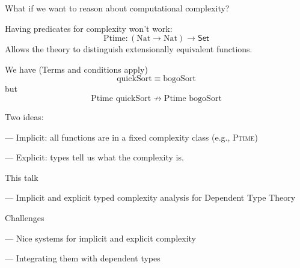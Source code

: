 \documentclass[xetex,serif,mathserif,aspectratio=169]{beamer}
\newcommand{\youtem}{\quad \textcolor{titlered!80}{---} \quad}
\newcommand{\HEAD}[1]{\textcolor{titlered}{#1}}
\begin{document}
\begin{frame}

  What if we want to reason about computational complexity?

  \pause
  \bigskip

  Having predicates for complexity won't work:
  \begin{displaymath}
    \mathrm{Ptime} : (\mathrm{Nat} \to \mathrm{Nat}) \to \mathsf{Set}
  \end{displaymath}
  Allows the theory to distinguish extensionally equivalent functions.

  \pause
  \bigskip
  We have \hspace{3em} \textcolor{black!60}{(Terms and conditions apply)}
  \begin{displaymath}
    \mathrm{quickSort} \equiv \mathrm{bogoSort}
  \end{displaymath}
  but
  \begin{displaymath}
    \mathrm{Ptime}\,\,\mathrm{quickSort} \not\to \mathrm{Ptime}\,\,\mathrm{bogoSort}
  \end{displaymath}

\end{frame}

\begin{frame}

  Two ideas:

  \medskip

  \youtem Implicit: all functions are in a fixed complexity class (e.g., \textsc{Ptime})

  \medskip

  \youtem Explicit: types tell us what the complexity is.

\end{frame}

\begin{frame}

  \HEAD{This talk}

  \medskip

  \youtem Implicit and explicit typed complexity analysis for Dependent Type Theory

  \bigskip

  \HEAD{Challenges}

  \medskip

  \youtem Nice systems for implicit and explicit complexity

  \medskip

  \youtem Integrating them with dependent types

\end{frame}
\end{document}
